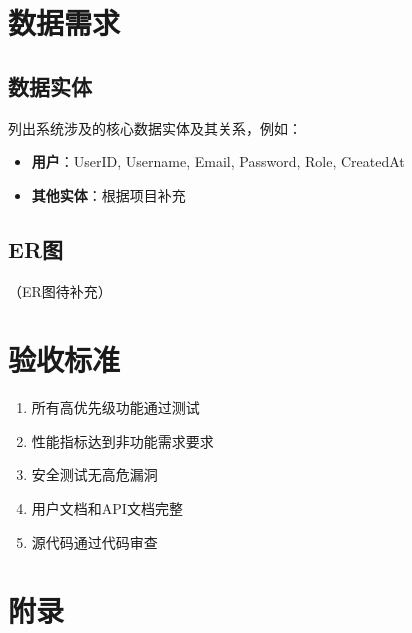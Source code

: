 \documentclass[12pt,a4paper]{ctexart}
\begin{document}

\section{数据需求}
\subsection{数据实体}
列出系统涉及的核心数据实体及其关系，例如：
\begin{itemize}
    \item \textbf{用户}：UserID, Username, Email, Password, Role, CreatedAt
    \item \textbf{其他实体}：根据项目补充
\end{itemize}

\subsection{ER图}
（ER图待补充）

\section{验收标准}
\begin{enumerate}
    \item 所有高优先级功能通过测试
    \item 性能指标达到非功能需求要求
    \item 安全测试无高危漏洞
    \item 用户文档和API文档完整
    \item 源代码通过代码审查
\end{enumerate}

\section{附录}
\end{document}
